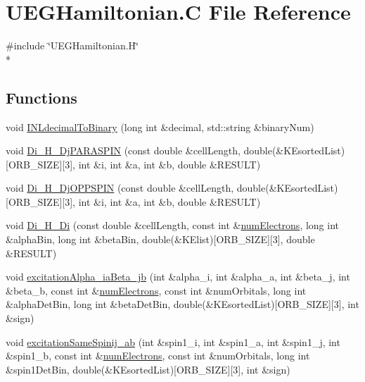\hypertarget{UEGHamiltonian_8C}{\section{U\-E\-G\-Hamiltonian.\-C File Reference}
\label{UEGHamiltonian_8C}
}
{\ttfamily \#include \char`\"{}U\-E\-G\-Hamiltonian.\-H\char`\"{}}\\*
\subsection*{Functions}
\begin{DoxyCompactItemize}
\item 
void \hyperlink{UEGHamiltonian_8C_ad349fcf2533ef69216553d20f96d6320}{I\-N\-Ldecimal\-To\-Binary} (long int \&decimal, std\-::string \&binary\-Num)
\item 
void \hyperlink{UEGHamiltonian_8C_a58e832f094a45f55f5d93061499c921b}{Di\-\_\-\-H\-\_\-\-Dj\-P\-A\-R\-A\-S\-P\-I\-N} (const double \&cell\-Length, double(\&K\-Esorted\-List)\mbox{[}O\-R\-B\-\_\-\-S\-I\-Z\-E\mbox{]}\mbox{[}3\mbox{]}, int \&i, int \&a, int \&b, double \&R\-E\-S\-U\-L\-T)
\item 
void \hyperlink{UEGHamiltonian_8C_aa62ae28804c3e7a3b7cfdc17bb083373}{Di\-\_\-\-H\-\_\-\-Dj\-O\-P\-P\-S\-P\-I\-N} (const double \&cell\-Length, double(\&K\-Esorted\-List)\mbox{[}O\-R\-B\-\_\-\-S\-I\-Z\-E\mbox{]}\mbox{[}3\mbox{]}, int \&i, int \&a, int \&b, double \&R\-E\-S\-U\-L\-T)
\item 
void \hyperlink{UEGHamiltonian_8C_a72450954a1e868acec0abb9b40eea196}{Di\-\_\-\-H\-\_\-\-Di} (const double \&cell\-Length, const int \&\hyperlink{UEG__MAIN__binarytest_8C_a613e167ad809e33c73b70a24822cc6f9}{num\-Electrons}, long int \&alpha\-Bin, long int \&beta\-Bin, double(\&K\-Elist)\mbox{[}O\-R\-B\-\_\-\-S\-I\-Z\-E\mbox{]}\mbox{[}3\mbox{]}, double \&R\-E\-S\-U\-L\-T)
\item 
void \hyperlink{UEGHamiltonian_8C_a0f083f849adf99409ad61ff7d9ab2dea}{excitation\-Alpha\-\_\-ia\-Beta\-\_\-jb} (int \&alpha\-\_\-i, int \&alpha\-\_\-a, int \&beta\-\_\-j, int \&beta\-\_\-b, const int \&\hyperlink{UEG__MAIN__binarytest_8C_a613e167ad809e33c73b70a24822cc6f9}{num\-Electrons}, const int \&num\-Orbitals, long int \&alpha\-Det\-Bin, long int \&beta\-Det\-Bin, double(\&K\-Esorted\-List)\mbox{[}O\-R\-B\-\_\-\-S\-I\-Z\-E\mbox{]}\mbox{[}3\mbox{]}, int \&sign)
\item 
void \hyperlink{UEGHamiltonian_8C_aa6447c7741a98dd5076411e98357c9d7}{excitation\-Same\-Spinij\-\_\-ab} (int \&spin1\-\_\-i, int \&spin1\-\_\-a, int \&spin1\-\_\-j, int \&spin1\-\_\-b, const int \&\hyperlink{UEG__MAIN__binarytest_8C_a613e167ad809e33c73b70a24822cc6f9}{num\-Electrons}, const int \&num\-Orbitals, long int \&spin1\-Det\-Bin, double(\&K\-Esorted\-List)\mbox{[}O\-R\-B\-\_\-\-S\-I\-Z\-E\mbox{]}\mbox{[}3\mbox{]}, int \&sign)
\end{DoxyCompactItemize}


